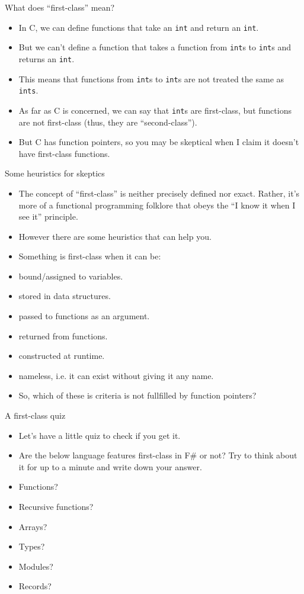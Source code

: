 \documentclass{beamer}
\newcommand{\m}[1]{\texttt{#1}}
\begin{document}
\begin{frame}{What does ``first-class'' mean?}
\begin{itemize}
	\item In C, we can define functions that take an \m{int} and return an \m{int}.
	\item But we can't define a function that takes a function from \m{int}s to \m{int}s and returns an \m{int}.
	\item This means that functions from \m{int}s to \m{int}s are not treated the same as \m{ints}.
	\item As far as C is concerned, we can say that \m{int}s are first-class, but functions are not first-class (thus, they are ``second-class'').
	\item But C has function pointers, so you may be skeptical when I claim it doesn't have first-class functions.
\end{itemize}
\end{frame}

\begin{frame}{Some heuristics for skeptics}
\begin{itemize}
	\item The concept of ``first-class'' is neither precisely defined nor exact. Rather, it's more of a functional programming folklore that obeys the ``I know it when I see it'' principle.
	\item However there are some heuristics that can help you.
	\item Something is first-class when it can be:
	\item bound/assigned to variables.
	\item stored in data structures.
	\item passed to functions as an argument.
	\item returned from functions.
	\item constructed at runtime.
	\item nameless, i.e. it can exist without giving it any name.
	\item So, which of these is criteria is not fullfilled by function pointers?
\end{itemize}
\end{frame}

\begin{frame}{A first-class quiz}
\begin{itemize}
	\item Let's have a little quiz to check if you get it.
	\item Are the below language features first-class in F\# or not? Try to think about it for up to a minute and write down your answer.
	\item Functions?
	\item Recursive functions?
	\item Arrays?
	\item Types?
	\item Modules?
	\item Records?
\end{itemize}
\end{frame}
\end{document}
